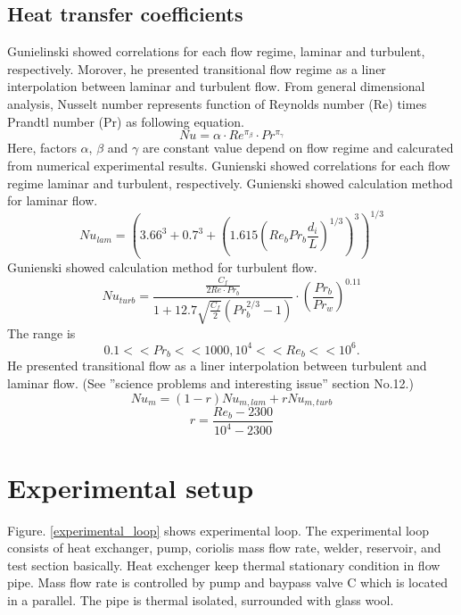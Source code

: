 \documentclass[conference]{IEEEtran}
\begin{document}
\subsection{Heat transfer coefficients}
Gunielinski \cite{Gnienlinski2010} showed correlations for each flow regime, laminar and turbulent, respectively.
Morover, he presented transitional flow regime as a liner interpolation between laminar and turbulent flow.
From general dimensional analysis, Nusselt number represents function of Reynolds number (Re) times Prandtl number (Pr) as following equation.
\begin{equation}
    Nu=\alpha \cdot Re^{\pi_{\beta}}\cdot Pr^{\pi_{\gamma}}\label{Nu_dimensional}
\end{equation}
Here, factors $\alpha$, $\beta$ and $\gamma$ are constant value depend on flow regime and calcurated from numerical experimental results.
Gunienski\cite{Gnienlinski2010} showed correlations for each flow regime laminar and turbulent, respectively.
Gunienski\cite{Gnienlinski2010} showed calculation method for laminar flow.
\begin{equation}
    Nu_{lam}=(3.66^{3}+0.7^{3}+(1.615(Re_{b}Pr_{b}\frac{d_{i}}{L})^{1/3})^{3})^{1/3}\label{Nu_laminar}
\end{equation}
Gunienski\cite{Gnienlinski2010} showed calculation method for turbulent flow.
\begin{equation}
    Nu_{turb}=\frac{\frac{C_{f}}{2Re\cdot Pr_{b}}}{1+12.7 \sqrt{\frac{C_{f}}{2}}(Pr_{b}^{2/3}-1)}\cdot (\frac{Pr_{b}}{Pr_{w}})^{0.11}
\end{equation}
The range is
\begin{equation}
    0.1<<Pr_{b}<<1000, 10^{4}<<Re_{b}<<10^{6}.
\end{equation}
He presented transitional flow as a liner interpolation between turbulent and laminar flow.
(See ''science problems and interesting issue'' section No.12.)
\begin{equation}
    Nu_{m}=(1-r)Nu_{m,lam}+rNu_{m,turb}
    \label{Nu_m}
\end{equation}
\begin{equation}
    r=\frac{Re_{b}-2300}{10^{4}-2300}
\end{equation}


\section{Experimental setup}
Figure. \ref{experimental_loop} shows experimental loop.
The experimental loop consists of heat exchanger, pump, coriolis mass flow rate, welder, reservoir, and test section basically.
Heat exchenger keep thermal stationary condition in flow pipe.
Mass flow rate is controlled by pump and baypass valve C which is located in a parallel.
The pipe is thermal isolated, surrounded with glass wool.\\
\end{document}
